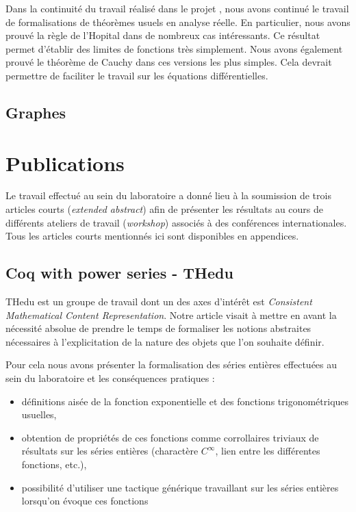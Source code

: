 \documentclass[11pt]{article}
\begin{document}
Dans la continuité du travail réalisé dans le projet \coquille{}, nous avons continué 
le travail de formalisations de théorèmes usuels en analyse réelle. En particulier, 
nous avons prouvé la règle de l'Hopital dans de nombreux cas intéressants. Ce résultat 
permet d'établir des limites de fonctions très simplement. Nous avons également  
prouvé le théorème de Cauchy dans ces versions les plus simples. Cela devrait permettre 
de faciliter le travail sur les équations différentielles. 

\subsection{Graphes}

\section{Publications}

Le travail effectué au sein du laboratoire \coqtail{} a donné lieu à la soumission
de trois articles courts (\textit{extended abstract}) afin de présenter les résultats
au cours de différents ateliers de travail (\textit{workshop}) associés à des
conférences internationales. Tous les articles courts mentionnés ici sont disponibles
en appendices.

\subsection{Coq with power series - THedu}

THedu est un groupe de travail dont un des axes d'intérêt est \textit{Consistent
Mathematical Content Representation}. Notre article visait à mettre en avant la
nécessité absolue de prendre le temps de formaliser les notions abstraites nécessaires
à l'explicitation de la nature des objets que l'on souhaite définir.

Pour cela nous avons présenter la formalisation des séries entières effectuées au
sein du laboratoire et les conséquences pratiques :
\begin{itemize}
 \item définitions aisée de la fonction exponentielle et des fonctions
 trigonométriques usuelles,
 \item obtention de propriétés de ces fonctions comme corrollaires triviaux
 de résultats sur les séries entières (charactère $C^{\infty}$, lien entre les
 différentes fonctions, etc.),
 \item possibilité d'utiliser une tactique générique travaillant sur les séries
 entières lorsqu'on évoque ces fonctions
\end{itemize}
\end{document}
